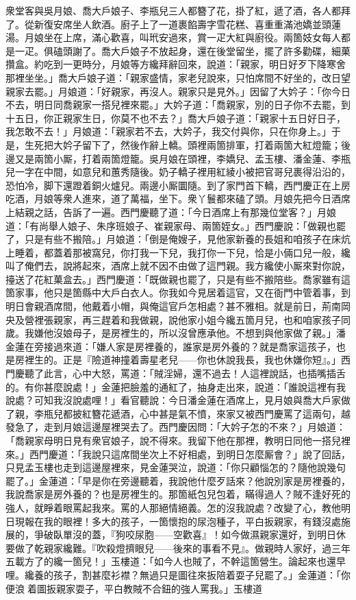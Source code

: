衆堂客與吳月娘、喬大戶娘子、李瓶兒三人都簪了花，掛了紅，遞了酒，各人都拜了。從新復安席坐人飲酒。廚子上了一道裹餡壽字雪花糕、喜重重滿池嬌並頭蓮湯。月娘坐在上席，滿心歡喜，叫玳安過來，賞一疋大紅與廚役。兩箇妓女每人都是一疋。俱磕頭謝了。喬大戶娘子不放起身，還在後堂留坐，擺了許多勸碟，細菓攢盒。約吃到一更時分，月娘等方纔拜辭回來，說道：「親家，明日好歹下降寒舍那裡坐坐。」喬大戶娘子道：「親家盛情，家老兒說來，只怕席間不好坐的，改日望親家去罷。」月娘道：「好親家，再沒人。親家只是見外。」因留了大妗子：「你今日不去，明日同喬親家一搭兒裡來罷。」大妗子道：「喬親家，別的日子你不去罷，到十五日，你正親家生日，你莫不也不去？」喬大戶娘子道：「親家十五日好日子，我怎敢不去！」月娘道：「親家若不去，大妗子，我交付與你，只在你身上。」于是，生死把大妗子留下了，然後作辭上轎。頭裡兩箇排軍，打着兩箇大紅燈籠；後邊又是兩箇小厮，打着兩箇燈籠。吳月娘在頭裡，李嬌兒、孟玉樓、潘金蓮、李瓶兒一字在中間，如意兒和蕙秀隨後。奶子轎子裡用紅綾小被把官哥兒裹得沿沿的，恐怕冷，脚下還蹬着銅火爐兒。兩邊小厮圜隨。到了家門首下轎，西門慶正在上房吃酒，月娘等衆人進來，道了萬福，坐下。衆丫鬟都來磕了頭。月娘先把今日酒席上結親之話，告訴了一遍。西門慶聽了道：「今日酒席上有那幾位堂客？」月娘道：「有尚舉人娘子、朱序班娘子、崔親家母、兩箇姪女。」西門慶說：「做親也罷了，只是有些不搬陪。」月娘道：「倒是俺嫂子，見他家新養的長姐和咱孩子在床炕上睡着，都蓋着那被窩兒，你打我一下兒，我打你一下兒，恰是小倆口兒一般，纔叫了俺們去，說將起來，酒席上就不因不由做了這門親。我方纔使小厮來對你說，擡送了花紅菓盒去。」西門慶道：「既做親也罷了，只是有些不搬陪些。喬家雖有這箇家事，他只是箇縣中大戶白衣人。你我如今見居着這官，又在衙門中管着事，到明日會親酒席間，他戴着小帽，與俺這官戶怎相處？甚不雅相。就是前日，荊南岡央及營裡張親家，再三趕着和我做親，說他家小姐今纔五箇月兒，也和咱家孩子同歲。我嫌他沒娘母子，是房裡生的，所以沒曾應承他。不想到與他家做了親。」潘金蓮在旁接過來道：「嫌人家是房裡養的，誰家是房外養的？就是喬家這孩子，也是房裡生的。正是『險道神撞着壽星老兒——你也休說我長，我也休嫌你短』。」西門慶聽了此言，心中大怒，罵道：「賊淫婦，還不過去！人這裡說話，也插嘴插舌的。有你甚麼說處！」金蓮把臉羞的通紅了，抽身走出來，說道：「誰說這裡有我說處？可知我沒說處哩！」{}看官聽說：今日潘金蓮在酒席上，見月娘與喬大戶家做了親，李瓶兒都披紅簪花遞酒，心中甚是氣不憤，來家又被西門慶罵了這兩句，越發急了，走到月娘這邊屋裡哭去了。西門慶因問：「大妗子怎的不來？」月娘道：「喬親家母明日見有衆官娘子，說不得來。我留下他在那裡，教明日同他一搭兒裡來。」西門慶道：「我說只這席間坐次上不好相處，到明日怎麼厮會？」說了回話，只見孟玉樓也走到這邊屋裡來，見金蓮哭泣，說道：「你只顧惱怎的？隨他說幾句罷了。」金蓮道：「早是你在旁邊聽着，我說他什麼歹話來？他說別家是房裡養的，我說喬家是房外養的？也是房裡生的。那箇紙包兒包着，瞞得過人？賊不逢好死的強人，就睜着眼罵起我來。罵的人那絕情絕義。怎的沒我說處？改變了心，教他明日現報在我的眼裡！多大的孩子，一箇懷抱的尿泡種子，平白扳親家，有錢沒處施展的，爭破臥單沒的蓋，『狗咬尿胞——空歡喜』！如今做濕親家還好，到明日休要做了乾親家纔難。『吹殺燈擠眼兒——後來的事看不見』。做親時人家好，過三年五載方了的纔一箇兒！」玉樓道：「如今人也賊了，不幹這箇營生。論起來也還早哩。纔養的孩子，割甚麼衫襟？無過只是圖往來扳陪着耍子兒罷了。」{}金蓮道：「你便浪𢵞着圖扳親家耍子，平白教賊不合鈕的強人罵我。」玉樓道